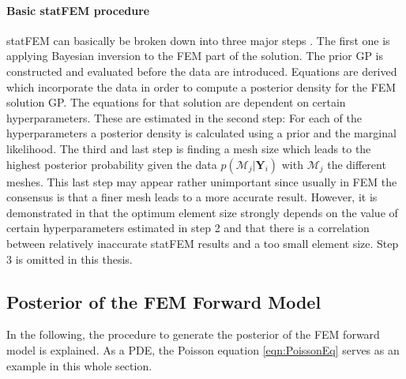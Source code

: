\documentclass[%
  a4paper,oneside,%
  11pt,%
  smallchapters,
  style=printdev,
  extramargin,
  green,%
  rgb, <cmyk>
  ]{tubsbook}
\begin{document}
\paragraph{Basic statFEM procedure}
statFEM can basically be broken down into three major steps \cite{girolami2021}. The first one is applying Bayesian inversion to the FEM part of the solution. The prior GP is constructed and evaluated before the data are introduced. Equations are derived which incorporate the data in order to compute a posterior density for the FEM solution GP. The equations for that solution are dependent on certain hyperparameters. These are estimated in the second step: For each of the hyperparameters a posterior density is calculated using a prior and the marginal likelihood. The third and last step is finding a mesh size which leads to the highest posterior probability given the data $p(\mathcal{M}_j|\bm{Y}_i)$ with $\mathcal{M}_j$ the different meshes. This last step may appear rather unimportant since usually in FEM the consensus is that a finer mesh leads to a more accurate result. However, it is demonstrated in \cite{girolami2021} that the optimum element size strongly depends on the value of certain hyperparameters estimated in step 2 and that there is a correlation between relatively inaccurate statFEM results and a too small element size. Step 3 is omitted in this thesis.

\subsection{Posterior of the FEM Forward Model}
In the following, the procedure to generate the posterior of the FEM forward model is explained. As a PDE, the Poisson equation \eqref{eqn:PoissonEq} serves as an example in this whole section.
\end{document}

